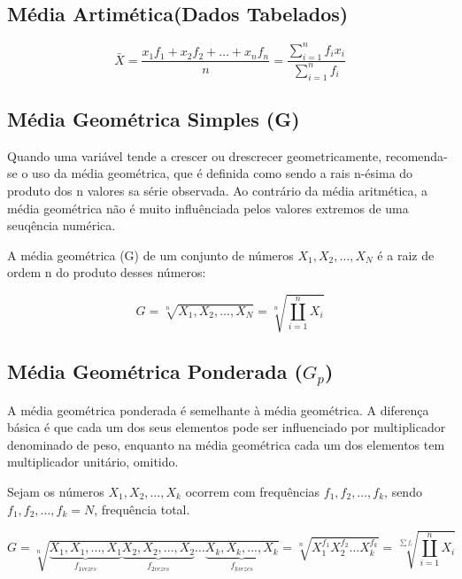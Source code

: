\subsection{Média Artimética(Dados Tabelados)}


\begin{equation}\label{media2}
     \bar{X}= \frac{x_{1}f_{1}+x_{2}f_{2}+\ldots+x_{n}f_{n}}{n} = \frac{\sum_{i=1}^{n}f_{i}x_{i}}{\sum_{i=1}^{n}f_{i}}
\end{equation}

\subsection{Média Geométrica Simples (G)}

Quando uma variável tende a crescer ou drescrecer geometricamente, recomenda-se o uso da média geométrica, que é definida como sendo a rais n-ésima do produto dos n valores sa série observada. Ao contrário da média aritmética, a média geométrica não é muito influênciada pelos valores extremos de uma seuqência numérica.\vskip0.3cm


A média geométrica (G) de um conjunto de números $X_{1},X_{2},\ldots,X_{N}$ é a raiz de ordem n do produto
desses números:

\begin{equation}\label{Geometrica}
    G=\sqrt[n]{X_{1},X_{2},\ldots,X_{N}}=\sqrt[n]{\coprod_{i=1}^{n}X_{i}}
\end{equation}


\subsection{Média Geométrica Ponderada ($G_{p}$)}

A média geométrica ponderada é semelhante à média geométrica. A diferença básica é que cada um dos seus elementos pode ser influenciado por multiplicador denominado de peso, enquanto na média geométrica cada um dos elementos tem multiplicador unitário, omitido.\vskip0.3cm


Sejam os números $X_{1},X_{2},\ldots,X_{k}$ ocorrem com frequências $f_{1},f_{2},\ldots,f_{k}$, sendo $f_{1},f_{2},\ldots,f_{k}=N$, frequência total.


\begin{equation}\label{Geometrica}
    G=\sqrt[n]{\underbrace{X_{1},X_{1},...,X_{1}}_{f_{1vezes}}\underbrace{X_{2},X_{2},...,X_{2}}_{f_{2vezes}} \ldots \underbrace{X_{k},X_{k},...,X_{k}}_{f_{kvezes}}}=\sqrt[n]{X_{1}^{f_{1}}X_{2}^{f_{2}}\ldots X_{k}^{f_{k}}}
 = \sqrt[\sum f_{i}]{\coprod_{i=1}^{n}X_{i}}
\end{equation}


